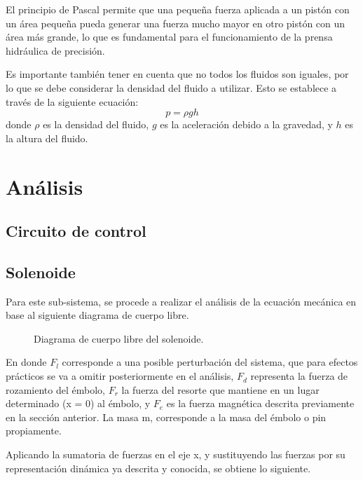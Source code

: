 \documentclass[journal]{IEEEtran}
\begin{document}
El principio de Pascal permite que una pequeña fuerza aplicada a un pistón con un área pequeña pueda generar una fuerza mucho mayor en otro pistón con un área más grande, lo que es fundamental para el funcionamiento de la prensa hidráulica de precisión.

Es importante también tener en cuenta que no todos los fluidos son iguales, por lo que se debe considerar la densidad del fluido a utilizar. Esto se establece a través de la siguiente ecuación:
\begin{equation}
    p = \rho g h
\end{equation}
donde $\rho$ es la densidad del fluido, $g$ es la aceleración debido a la gravedad, y $h$ es la altura del fluido.
\section{Análisis}

\subsection{Circuito de control}

\subsection{Solenoide}
Para este sub-sistema, se procede a realizar el análisis de la ecuación mecánica en base al 
siguiente diagrama de cuerpo libre. 

\begin{figure}[H]
  \centering
  \caption{Diagrama de cuerpo libre del solenoide.}
  \label{fig:diagrama_cuerpolibre_solenoide}
\end{figure}

En donde $F_l$ corresponde a una posible perturbación del sistema, que para efectos prácticos se va a omitir posteriormente
en el análisis, $F_d$ representa la fuerza de rozamiento del émbolo, $F_r$ la fuerza del resorte que mantiene en un lugar
determinado (x = 0) al émbolo, y $F_e$ es la fuerza magnética descrita previamente en la sección anterior. La masa m, corresponde
a la masa del émbolo o pin propiamente.

Aplicando la sumatoria de fuerzas en el eje x, y sustituyendo las fuerzas por su representación dinámica ya descrita y conocida, 
se obtiene lo siguiente.
\end{document}
